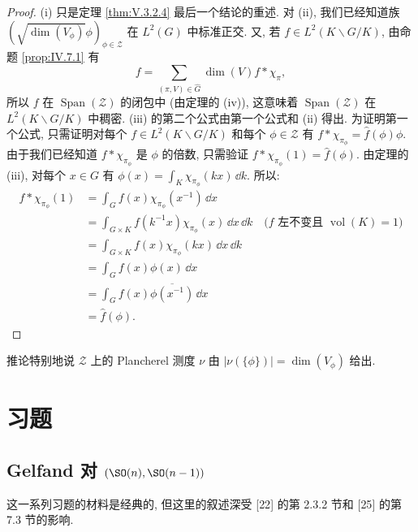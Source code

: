\begin{proof}
(i) 只是定理 \ref{thm:V.3.2.4} 最后一个结论的重述.
对 (ii), 我们已经知道族 $(\sqrt{\dim(V_{\phi})}\phi)_{\phi \in \mathcal{Z}}$ 在 $L^2(G)$ 中标准正交. 又, 若 $f \in L^2(K\backslash G/K)$, 由命题 \ref{prop:IV.7.1} 有
\[
f = \sum_{(\pi, V) \in \widehat{G}}\dim(V)f * \chi_{\pi},
\]
所以 $f$ 在 $\operatorname{Span}(\mathcal{Z})$ 的闭包中 (由定理的 (iv)), 这意味着 $\operatorname{Span}(\mathcal{Z})$ 在 $L^2(K\backslash G/K)$ 中稠密.
(iii) 的第二个公式由第一个公式和 (ii) 得出. 为证明第一个公式, 只需证明对每个 $f \in L^2(K\backslash G/K)$ 和每个 $\phi \in \mathcal{Z}$ 有 $f * \chi_{\pi_{\phi}} = \hat{f}(\phi)\phi$. 由于我们已经知道 $f * \chi_{\pi_{\phi}}$ 是 $\phi$ 的倍数, 只需验证 $f * \chi_{\pi_{\phi}}(1) = \hat{f}(\phi)$. 由定理的 (iii), 对每个 $x \in G$ 有 $\phi(x) = \int_K\chi_{\pi_{\phi}}(kx)\,\dd k$. 所以:
\begin{align*}
f * \chi_{\pi_{\phi}}(1) &= \int_G f(x)\chi_{\pi_{\phi}}(x^{-1})\,\dd x \\
&= \int_{G \times K}f(k^{-1}x)\chi_{\pi_{\phi}}(x)\,\dd x\,\dd k \quad \text{($f$ 左不变且 } \operatorname{vol}(K) = 1\text{)} \\
&= \int_{G \times K}f(x)\chi_{\pi_{\phi}}(kx)\,\dd x\,\dd k \\
&= \int_G f(x)\phi(x)\,\dd x \\
&= \int_G f(x)\overline{\phi(x^{-1})}\,\dd x \\
&= \hat{f}(\phi).
\end{align*}
\end{proof}

\begin{remark}[Plancherel 测度]
\label{rem:V.7.3}
推论特别地说 $\mathcal{Z}$ 上的 Plancherel 测度 $\nu$ 由 $|\nu(\{\phi\})| = \dim(V_{\phi})$ 给出.
\end{remark}

\section{习题}

\subsection{\texorpdfstring{Gelfand 对 $(\SO(n), \SO(n-1))$}{Gelfand 对}}

这一系列习题的材料是经典的, 但这里的叙述深受 {[}22{]} 的第 2.3.2 节和 {[}25{]} 的第 7.3 节的影响.

